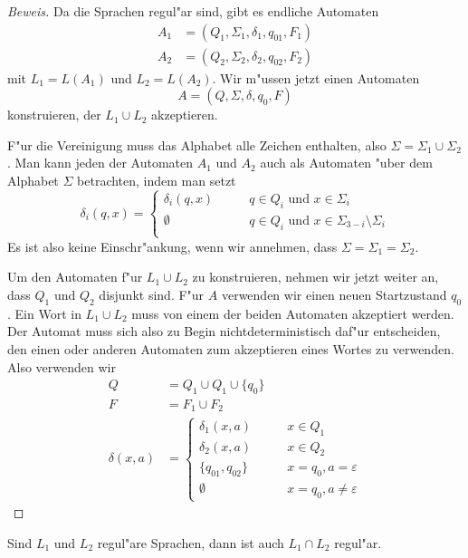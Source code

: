\begin{proof}[Beweis]
Da die Sprachen regul"ar sind, gibt es endliche Automaten 
\begin{align*}
A_1&=(Q_1,\Sigma_1,\delta_1, q_{01}, F_1)\\
A_2&=(Q_2,\Sigma_2,\delta_2, q_{02}, F_2)
\end{align*}
mit $L_1=L(A_1)$ und $L_2=L(A_2)$. Wir m"ussen
jetzt einen Automaten
\[
A = (Q, \Sigma, \delta, q_0, F)
\]
konstruieren, der $L_1\cup L_2$ akzeptieren.

F"ur die Vereinigung muss das Alphabet alle Zeichen enthalten,
also $\Sigma = \Sigma_1\cup\Sigma_2$. Man kann jeden der Automaten 
$A_1$ und $A_2$ auch als Automaten "uber dem Alphabet $\Sigma$
betrachten, indem man setzt
\[
\delta_i(q, x)=\begin{cases}
\delta_i(q,x)&\qquad q\in Q_i\text{ und }  x\in \Sigma_i\\
\emptyset&\qquad q\in Q_i\text{ und } x\in \Sigma_{3-i}\setminus \Sigma_i\\
\end{cases}
\]
Es ist also keine Einschr"ankung, wenn wir annehmen, dass
$\Sigma=\Sigma_1=\Sigma_2$.

Um den Automaten f"ur $L_1\cup L_2$ zu konstruieren, nehmen wir jetzt
weiter an, dass $Q_1$ und $Q_2$ disjunkt sind.
F"ur $A$ verwenden wir einen neuen Startzustand $q_0$.
Ein Wort in $L_1\cup L_2$ muss von einem der beiden Automaten
akzeptiert werden.
Der Automat muss sich also zu Begin nichtdeterministisch
daf"ur entscheiden, den einen oder anderen Automaten zum
akzeptieren eines Wortes zu verwenden.
Also verwenden wir 
\begin{align*}
Q&=Q_1\cup Q_1\cup \{q_0\}\\
F&=F_1\cup F_2\\
\delta(x,a)&=\begin{cases}
\delta_1(x,a)&\qquad x\in Q_1\\
\delta_2(x,a)&\qquad x\in Q_2\\
\{q_{01}, q_{02}\}&\qquad x=q_0, a=\varepsilon\\
\emptyset&\qquad x=q_0, a\ne\varepsilon
\end{cases}
\end{align*}
\end{proof}

\begin{satz}
\label{satz_intersection}
Sind $L_1$ und $L_2$ regul"are Sprachen, dann
ist auch $L_1\cap L_2$ regul"ar.
\end{satz}

